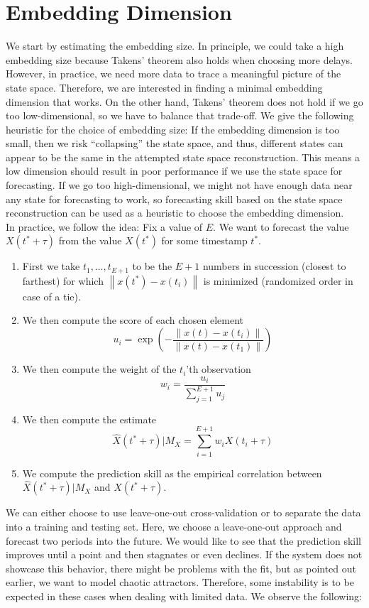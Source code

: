 \documentclass[11pt, a4paper]{memoir}
\theoremstyle{break}
\theoremstyle{break}
\theoremstyle{nonumberplain}
\newcommand{\norm}[1]{\left\lVert#1\right\rVert}
\begin{document}
\section{Embedding Dimension}
We start by estimating the embedding size. In principle, we could take a high embedding size because Takens' theorem also holds when choosing more delays. However, in practice, we need more data to trace a meaningful picture of the state space. Therefore, we are interested in finding a minimal embedding dimension that works. On the other hand, Takens' theorem does not hold if we go too low-dimensional, so we have to balance that trade-off. We give the following heuristic for the choice of embedding size: If the embedding dimension is too small, then we risk \enquote{collapsing} the state space, and thus, different states can appear to be the same in the attempted state space reconstruction. This means a low dimension should result in poor performance if we use the state space for forecasting. If we go too high-dimensional, we might not have enough data near any state for forecasting to work, so forecasting skill based on the state space reconstruction can be used as a heuristic to choose the embedding dimension.\\[5pt]
In practice, we follow the idea: Fix a value of $E$. We want to forecast the value $X(t^*+\tau)$ from the value $X(t^*)$ for some timestamp $t^*$.
\begin{enumerate}[label=(\roman*)]
	\item First we take $t_1,\ldots,t_{E+1}$ to be the $E+1$ numbers in succession (closest to farthest) for which $\norm{x(t^*)-x(t_{i})}$ is minimized (randomized order in case of a tie).
	\item We then compute the score of each chosen element
	$$u_i=\exp\left(-\frac{\norm{x(t)-x(t_i)}}{\norm{x(t)-x(t_1)}}\right)$$
	\item We then compute the weight of the $t_i$'th observation
	$$w_i=\frac{u_i}{\sum_{j=1}^{E+1} u_j}$$
	\item We then compute the estimate
	$$\hat{X}(t^*+\tau)|M_X=\sum_{i=1}^{E+1} w_i X(t_i+\tau)$$
	\item We compute the prediction skill as the empirical correlation between $\hat{X}(t^*+\tau)|M_X$ and $X(t^*+\tau)$.
\end{enumerate}
We can either choose to use leave-one-out cross-validation or to separate the data into a training and testing set. Here, we choose a leave-one-out approach and forecast two periods into the future. We would like to see that the prediction skill improves until a point and then stagnates or even declines. If the system does not showcase this behavior, there might be problems with the fit, but as pointed out earlier, we want to model chaotic attractors. Therefore, some instability is to be expected in these cases when dealing with limited data. We observe the following:
\end{document}
